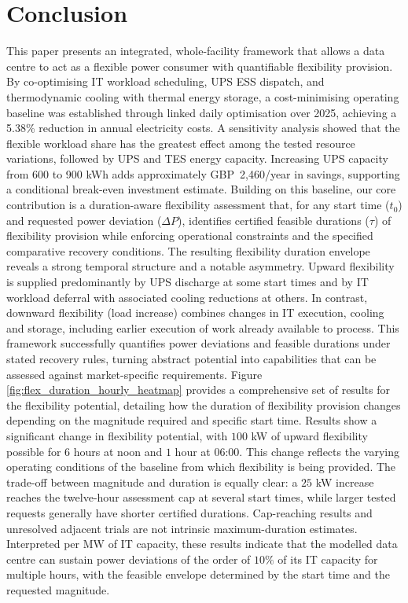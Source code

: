 \documentclass[lettersize,journal]{IEEEtran}
\newcommand{\rev}[1]{#1}
\begin{document}
\section{Conclusion}\label{sec:conclusion}

This paper presents an integrated, whole-facility framework that allows a data centre to act as a flexible power consumer with quantifiable flexibility provision. By co-optimising IT workload scheduling, UPS ESS dispatch, and thermodynamic cooling with thermal energy storage, a cost-minimising operating baseline was established through linked daily optimisation over 2025, achieving a \rev{5.38\% reduction in annual electricity costs. A sensitivity analysis showed that the flexible workload share has the greatest effect among the tested resource variations, followed by UPS and TES energy capacity. Increasing UPS capacity from 600 to 900 kWh adds approximately GBP~2,460/year in savings, supporting a conditional break-even investment estimate.} Building on this baseline, our core contribution is a duration-aware flexibility assessment that, for any start time ($t_0$) and requested power deviation ($\Delta P$), identifies certified feasible durations ($\tau$) of flexibility provision while enforcing operational constraints and the specified comparative recovery conditions. The resulting flexibility duration envelope reveals a strong temporal structure and a notable asymmetry. Upward flexibility is supplied predominantly by UPS discharge at some start times and by IT workload deferral with associated cooling reductions at others. In contrast, downward flexibility (load increase) combines changes in IT execution, cooling and storage, including earlier execution of work already available to process. This framework successfully quantifies power deviations and feasible durations under stated recovery rules, turning abstract potential into capabilities that can be assessed against market-specific requirements. Figure \ref{fig:flex_duration_hourly_heatmap} provides a comprehensive set of results for the flexibility potential, detailing how the duration of flexibility provision changes depending on the magnitude required and specific start time. Results show a significant change in flexibility potential, with $100$ kW of upward flexibility possible for $6$ hours at noon and $1$ hour at $06$:$00$. This change reflects the varying operating conditions of the baseline from which flexibility is being provided. \rev{The trade-off between magnitude and duration is equally clear: a $25$ kW increase reaches the twelve-hour assessment cap at several start times, while larger tested requests generally have shorter certified durations. Cap-reaching results and unresolved adjacent trials are not intrinsic maximum-duration estimates. Interpreted per MW of IT capacity, these results indicate that the modelled data centre can sustain power deviations of the order of $10\%$ of its IT capacity for multiple hours, with the feasible envelope determined by the start time and the requested magnitude.}
\end{document}
